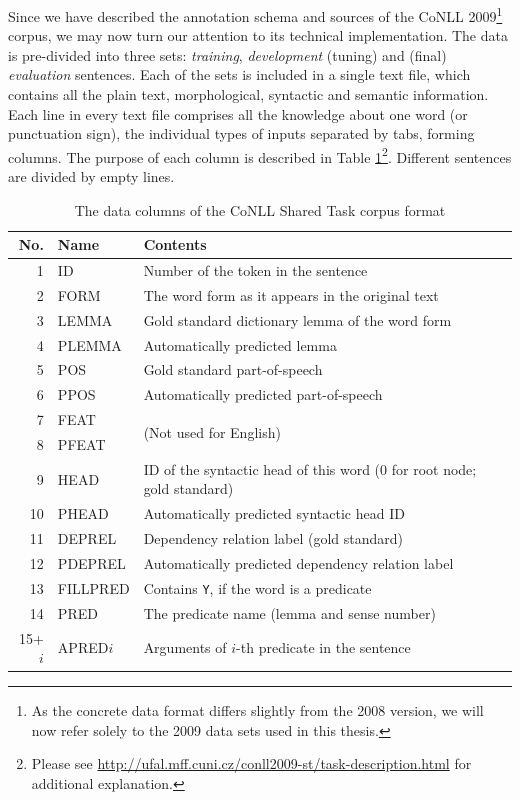 \documentclass[12pt,notitlepage]{report}
\begin{document}
Since we have described the annotation schema and sources of the CoNLL 2009\footnote{As the concrete data format differs slightly from the 2008 version, we will now refer solely to the 2009 data sets used in this thesis.} corpus, we may now turn our attention to its technical implementation. The data is pre-divided into three sets: \emph{training}, \emph{development} (tuning) and (final) \emph{evaluation} sentences. Each of the sets is included in a single text file, which contains all the plain text, morphological, syntactic and semantic information. Each line in every text file comprises all the knowledge about one word (or punctuation sign), the individual types of inputs separated by tabs, forming columns. The purpose of each column is described in Table \ref{tab:st-columns}\footnote{Please see \url{http://ufal.mff.cuni.cz/conll2009-st/task-description.html} for additional explanation.}. Different sentences are divided by empty lines.

\begin{table}[htb]\footnotesize
\caption{The data columns of the CoNLL Shared Task corpus format}\label{tab:st-columns}
\begin{center}
\begin{tabular}{|r|l|l|}\hline
\bf No. & \bf Name & \bf Contents \\\hline
1 & ID & Number of the token in the sentence \\
2 & FORM & The word form as it appears in the original text \\
3 & LEMMA & Gold standard dictionary lemma of the word form \\
4 & PLEMMA & Automatically predicted lemma \\
5 & POS & Gold standard part-of-speech \\
6 & PPOS & Automatically predicted part-of-speech \\
7 & FEAT & \multirow{2}{*}{(Not used for English)} \\
8 & PFEAT & \\
9 & HEAD & ID of the syntactic head of this word (0 for root node; gold standard) \\
10 & PHEAD & Automatically predicted syntactic head ID \\
11 & DEPREL & Dependency relation label (gold standard) \\
12 & PDEPREL & Automatically predicted dependency relation label \\
13 & FILLPRED & Contains \texttt{Y}, if the word is a predicate \\
14 & PRED & The predicate name (lemma and sense number) \\
15+$i$ & APRED$i$ & Arguments of $i$-th predicate in the sentence \\\hline
\end{tabular}
\end{center}
\end{table}
\end{document}
